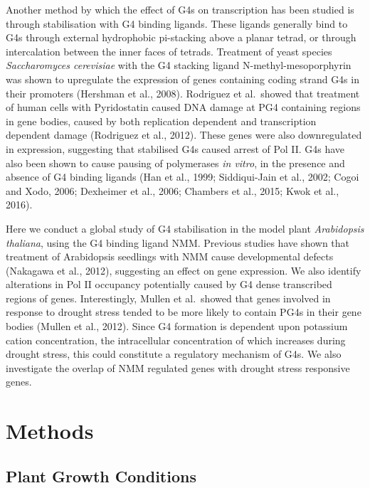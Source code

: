 \documentclass[12pt,a4paper,]{report}
\begin{document}
Another method by which the effect of G4s on transcription has been
studied is through stabilisation with G4 binding ligands. These ligands
generally bind to G4s through external hydrophobic pi-stacking above a
planar tetrad, or through intercalation between the inner faces of
tetrads. Treatment of yeast species \emph{Saccharomyces cerevisiae} with
the G4 stacking ligand N-methyl-mesoporphyrin was shown to upregulate
the expression of genes containing coding strand G4s in their promoters
(Hershman et al., 2008). Rodriguez et al.~showed that treatment of human
cells with Pyridostatin caused DNA damage at PG4 containing regions in
gene bodies, caused by both replication dependent and transcription
dependent damage (Rodriguez et al., 2012). These genes were also
downregulated in expression, suggesting that stabilised G4s caused
arrest of Pol II. G4s have also been shown to cause pausing of
polymerases \emph{in vitro}, in the presence and absence of G4 binding
ligands (Han et al., 1999; Siddiqui-Jain et al., 2002; Cogoi and Xodo,
2006; Dexheimer et al., 2006; Chambers et al., 2015; Kwok et al., 2016).

Here we conduct a global study of G4 stabilisation in the model plant
\emph{Arabidopsis thaliana}, using the G4 binding ligand NMM. Previous
studies have shown that treatment of Arabidopsis seedlings with NMM
cause developmental defects (Nakagawa et al., 2012), suggesting an
effect on gene expression. We also identify alterations in Pol II
occupancy potentially caused by G4 dense transcribed regions of genes.
Interestingly, Mullen et al.~showed that genes involved in response to
drought stress tended to be more likely to contain PG4s in their gene
bodies (Mullen et al., 2012). Since G4 formation is dependent upon
potassium cation concentration, the intracellular concentration of which
increases during drought stress, this could constitute a regulatory
mechanism of G4s. We also investigate the overlap of NMM regulated genes
with drought stress responsive genes.

\newpage

\hypertarget{methods}{%
\section{Methods}\label{methods}}

\hypertarget{plant-growth-conditions}{%
\subsection{Plant Growth Conditions}\label{plant-growth-conditions}}
\end{document}
